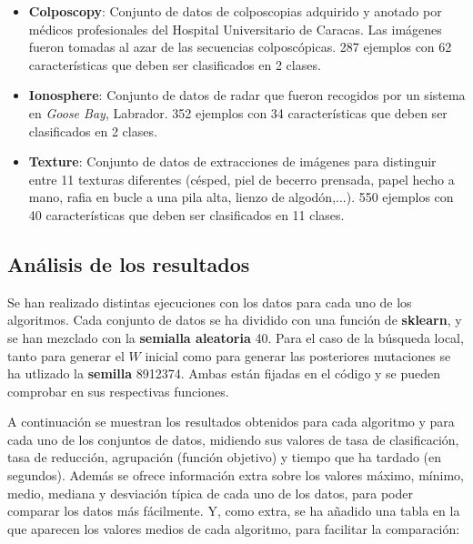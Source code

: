 \documentclass[11pt,a4paper]{article}
\begin{document}
\begin{itemize}[label=\textbullet]
	\item \textbf{Colposcopy}: Conjunto de datos de colposcopias adquirido y anotado por médicos profesionales del Hospital
	Universitario de Caracas. Las imágenes fueron tomadas al azar de las secuencias colposcópicas. 287 ejemplos con 62
	características que deben ser clasificados en 2 clases.
	\item \textbf{Ionosphere}: Conjunto de datos de radar que fueron recogidos por un sistema en \textit{Goose Bay},
	Labrador. 352 ejemplos con 34 características que deben ser clasificados en 2 clases.
	\item \textbf{Texture}: Conjunto de datos de extracciones de imágenes para distinguir entre 11 texturas diferentes
	(césped, piel de becerro prensada, papel hecho a mano, rafia en bucle a una pila alta, lienzo de algodón,...). 550
	ejemplos con 40 características que deben ser clasificados en 11 clases.
\end{itemize}

\subsection{Análisis de los resultados}

Se han realizado distintas ejecuciones con los datos para cada uno de los algoritmos. Cada conjunto de datos se ha dividido
con una función de \textbf{sklearn}, y se han mezclado con la \textbf{semialla aleatoria} 40. Para el caso de la búsqueda
local, tanto para generar el $W$ inicial como para generar las posteriores mutaciones se ha utlizado la \textbf{semilla}
8912374. Ambas están fijadas en el código y se pueden comprobar en sus respectivas funciones.

A continuación se muestran los resultados obtenidos para cada algoritmo y para cada uno de los conjuntos de datos, midiendo
sus valores de tasa de clasificación, tasa de reducción, agrupación (función objetivo) y tiempo que ha tardado (en segundos).
Además se ofrece información extra sobre los valores máximo, mínimo, medio, mediana y desviación típica de cada uno de los
datos, para poder comparar los datos más fácilmente. Y, como extra, se ha añadido una tabla en la que aparecen los valores
medios de cada algoritmo, para facilitar la comparación:
\end{document}
